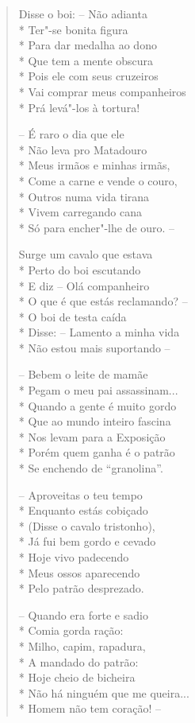 \begin{verse}
Disse o boi: --  Não adianta\\*
Ter"-se bonita figura\\*
Para dar medalha ao dono\\*
Que tem a mente obscura\\*
Pois ele com seus cruzeiros\\*
Vai comprar meus companheiros\\*
Prá levá"-los à tortura!

--  É raro o dia que ele\\*
Não leva pro Matadouro\\*
Meus irmãos e minhas irmãs,\\*
Come a carne e vende o couro,\\*
Outros numa vida tirana\\*
Vivem carregando cana\\*
Só para encher"-lhe de ouro. --

Surge um cavalo que estava\\*
Perto do boi escutando\\*
E diz --  Olá companheiro\\*
O que é que estás reclamando? --\\*
O boi de testa caída\\*
Disse: --  Lamento a minha vida\\*
Não estou mais suportando --

--  Bebem o leite de mamãe\\*
Pegam o meu pai assassinam...\\*
Quando a gente é muito gordo\\*
Que ao mundo inteiro fascina\\*
Nos levam para a Exposição\\*
Porém quem ganha é o patrão\\*
Se enchendo de ``granolina''.

--  Aproveitas o teu tempo\\*
Enquanto estás cobiçado\\*
(Disse o cavalo tristonho),\\*
Já fui bem gordo e cevado\\*
Hoje vivo padecendo\\*
Meus ossos aparecendo\\*
Pelo patrão desprezado.

--  Quando era forte e sadio\\*
Comia gorda ração:\\*
Milho, capim, rapadura,\\*
A mandado do patrão:\\*
Hoje cheio de bicheira\\*
Não há ninguém que me queira...\\*
Homem não tem coração! --


\end{verse}
